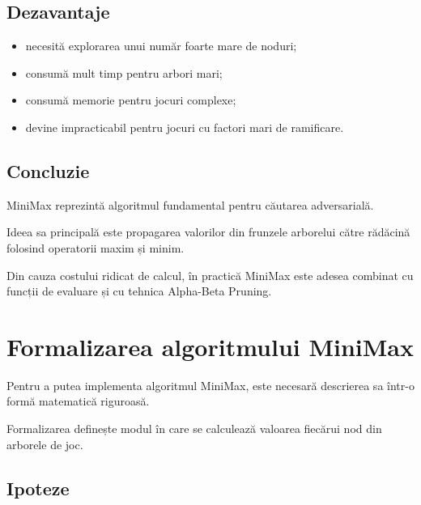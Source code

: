 \documentclass[12pt,a4paper]{article}
\begin{document}
\subsection{Dezavantaje}

\begin{itemize}
\item necesită explorarea unui număr foarte mare de noduri;
\item consumă mult timp pentru arbori mari;
\item consumă memorie pentru jocuri complexe;
\item devine impracticabil pentru jocuri cu factori mari de ramificare.
\end{itemize}

\subsection{Concluzie}

MiniMax reprezintă algoritmul fundamental pentru căutarea adversarială.

Ideea sa principală este propagarea valorilor din frunzele arborelui către rădăcină folosind operatorii maxim și minim.

Din cauza costului ridicat de calcul, în practică MiniMax este adesea combinat cu funcții de evaluare și cu tehnica Alpha-Beta Pruning.

























\section{Formalizarea algoritmului MiniMax}

Pentru a putea implementa algoritmul MiniMax, este necesară descrierea sa într-o formă matematică riguroasă.

Formalizarea definește modul în care se calculează valoarea fiecărui nod din arborele de joc.

\subsection{Ipoteze}
\end{document}
